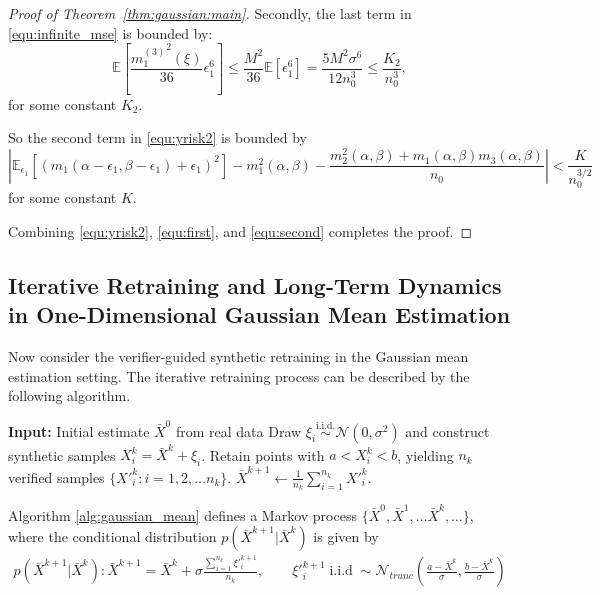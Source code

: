 \begin{proof}[Proof of Theorem~\ref{thm:gaussian:main}]
Secondly, the last term in \eqref{equ:infinite_mse} is bounded by:
\[
\mathbb{E} \left[ \frac{{m_1^{(3)}}^2(\xi)}{36} \epsilon_1^6 \right]
\leq \frac{M^2}{36} \mathbb{E}[\epsilon_1^6] 
= \frac{5 M^2 \sigma^6}{12 n_0^3} \leq \frac{K_2}{n_0^3},
\]
for some constant \( K_2 \).

So the second term in \ref{equ:yrisk2} is bounded by
\begin{equation}\label{equ:second}
    \left| \mathbb{E}_{\epsilon_1} \left[ \left(m_1(\alpha - \epsilon_1, \beta - \epsilon_1) + \epsilon_1 \right)^2 \right] 
- m_1^2(\alpha, \beta) 
- \frac{m_2^2(\alpha, \beta) + m_1(\alpha,\beta)m_3(\alpha, \beta)}{n_0}
\right| 
< \frac{K}{n_0^{3/2}}
\end{equation}
for some constant \( K \).

Combining \ref{equ:yrisk2}, \ref{equ:first}, and \ref{equ:second} completes the proof.


\end{proof}

\subsection{Iterative Retraining and Long-Term Dynamics in One-Dimensional Gaussian Mean Estimation}

Now consider the verifier-guided synthetic retraining in the Gaussian mean estimation setting.
The iterative retraining process can be described by the following algorithm.

\begin{algorithm}[H]
\caption{Iterative Verifier-Guided Retraining for Gaussian Mean Estimation}
\label{alg:gaussian_mean}
\begin{algorithmic}[1]
  \State \textbf{Input:} Initial estimate $\bar X^{0}$ from real data
    \State Draw $\xi_i \stackrel{\text{i.i.d.}}{\sim}\mathcal N(0,\sigma^2)$ and construct synthetic samples $X_i^{k} = \bar X^{k} + \xi_i$.
    \State Retain points with $a < X_i^{k} < b$, yielding $n_k$ verified samples $\{X'^k_i:i=1,2,\ldots n_k\}$.
    \State $\bar X^{k+1} \gets \frac{1}{n_k}\sum_{i=1}^{n_k} X'^k_i$.
  \EndFor
\end{algorithmic}
\end{algorithm}

Algorithm \ref{alg:gaussian_mean} defines a Markov process $\{\bar{X}^0,\bar{X}^1, \dots \bar{X}^k, \dots\}$, where the conditional distribution $p(\bar{X}^{k+1} |\bar{X}^{k})$ is given by
\begin{align}\label{equ:gaussian:transition}
p(\bar{X}^{k+1} |\bar{X}^{k}): \bar{X}^{k+1} = \bar{X}^k + \sigma \frac{\sum_{i=1}^{n_k}\xi'^{k+1}_i}{n_k}, \qquad \xi'^{k+1}_i \;\text{i.i.d}\; \sim \mathcal{N}_{trunc}(\frac{a - \bar{X}^k}{\sigma}, \frac{b - \bar{X}^k}{\sigma})
\end{align}


